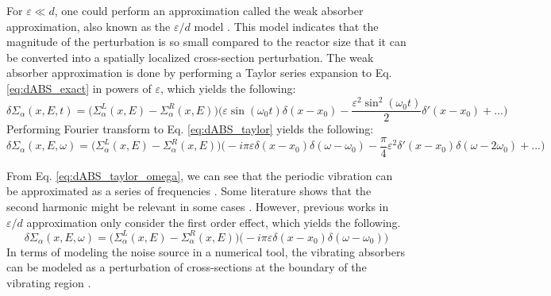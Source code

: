 For $\varepsilon\ll d$, one could perform an approximation called the weak absorber approximation, also known as the $\varepsilon/d$ model \cite{pazsitInvestigationSpaceDependentNoise1977}. This model indicates that the magnitude of the perturbation is so small compared to the reactor size that it can be converted into a spatially localized cross-section perturbation. The weak absorber approximation is done by performing a Taylor series expansion to Eq. \ref{eq:dABS_exact} in powers of $\varepsilon$, which yields the following:
\begin{equation}\label{eq:dABS_taylor}
    \delta\Sigma_\alpha (x, E, t) = \biggl(\Sigma_\alpha^L (x, E)-\Sigma_\alpha^R (x, E)\biggr) \biggl( \varepsilon \sin(\omega_0 t) \delta(x-x_0)-\frac{\varepsilon^2 \sin^2(\omega_0 t)}{2} \delta'(x-x_0)+ ... \biggr)
\end{equation}
Performing Fourier transform to Eq. \ref{eq:dABS_taylor} yields the following:
\begin{equation}\label{eq:dABS_taylor_omega}
    \delta\Sigma_\alpha (x, E, \omega) = \biggl(\Sigma_\alpha^L (x, E)-\Sigma_\alpha^R (x, E)\biggr) \biggl( -i \pi \varepsilon \delta(x-x_0) \delta(\omega-\omega_0)-\frac{\pi}{4} \varepsilon^2 \delta'(x-x_0) \delta(\omega-2\omega_0)+ ... \biggr)
\end{equation}

From Eq. \ref{eq:dABS_taylor_omega}, we can see that the periodic vibration can be approximated as a series of frequencies \cite{zoiaAnalysisNeutronNoise2021}. Some literature shows that the second harmonic might be relevant in some cases \cite{luciaCorrelationNeutronNoise1973, pazsitInvestigationSpaceDependentNoise1977, pazsitLinearizationVibrationinducedNoise1984}. However, previous works in $\varepsilon/d$ approximation only consider the first order effect, which yields the following.
\begin{equation}\label{eq:dABS_taylor_omega_truncated}
    \delta\Sigma_\alpha (x, E, \omega) = \biggl(\Sigma_\alpha^L (x, E)-\Sigma_\alpha^R (x, E)\biggr) \biggl( -i \pi \varepsilon \delta(x-x_0) \delta(\omega-\omega_0) \biggr)
\end{equation}
In terms of modeling the noise source in a numerical tool, the vibrating absorbers can be modeled as a perturbation of cross-sections at the boundary of the vibrating region \cite{mylonakisCORESIMFlexible2021}.

